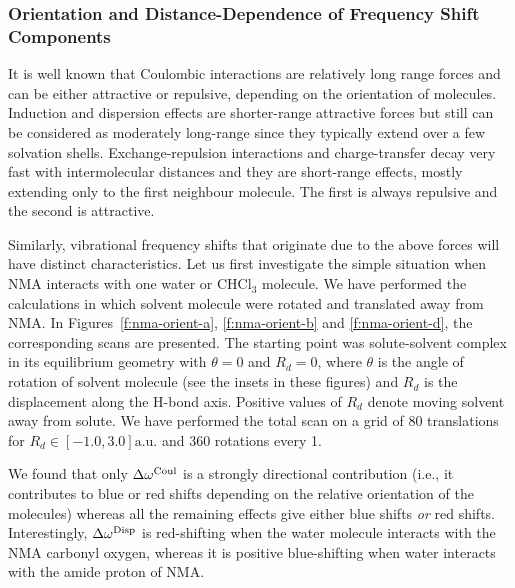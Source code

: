 \documentclass[a4paper,titlepage,twoside,fleqn,12pt]{book}
\begin{document}
\begin{refsection}
\subsubsection{Orientation and Distance\hyp{}Dependence of Frequency Shift Components\label{s:amide-I-orient}}

It is well known that Coulombic interactions are relatively long range forces
and can be either attractive or repulsive, depending on the orientation
of molecules.
Induction and dispersion effects are shorter\hyp{}range attractive forces but still
can be considered as moderately long\hyp{}range since they typically
extend over a few solvation shells. Exchange\hyp{}repulsion interactions
and charge\hyp{}transfer decay very fast with intermolecular distances
and they are short\hyp{}range effects, mostly extending only to the first
neighbour molecule. The first is always repulsive and the second is attractive.

Similarly, vibrational frequency shifts that originate due to the above
forces will have distinct characteristics. Let us first investigate
the simple situation when NMA interacts with one water or CHCl$_3$ molecule.
We have performed the calculations in which solvent molecule were rotated
and translated away from NMA. In Figures~\ref{f:nma-orient-a}, \ref{f:nma-orient-b}
and \ref{f:nma-orient-d}, the corresponding scans are presented.
The starting point was solute\hyp{}solvent complex in its equilibrium geometry
with $\theta=0$ and $R_d=0$, where $\theta$ is the angle of rotation of solvent
molecule (see the insets in these figures) and $R_d$ is the displacement along the H-bond axis.
Positive values of $R_d$ denote moving solvent away from solute. We have performed
the total scan on a grid of 80 translations for $R_d\in [-1.0,3.0]\text{a.u.}$ 
and 360 rotations every 1\textdegree.

We found that only $\Delta\omega^{\rm Coul}$ is a strongly directional
contribution (i.e., it contributes to blue or red shifts depending on the
relative orientation of the molecules) whereas all the remaining effects
give either blue shifts \emph{or} red shifts. Interestingly, $\Delta\omega^{\rm Disp}$
is red\hyp{}shifting when
the water molecule interacts with the NMA carbonyl oxygen,
whereas it is positive blue-shifting when water interacts with
the amide proton of NMA.


\end{refsection}
\end{document}
